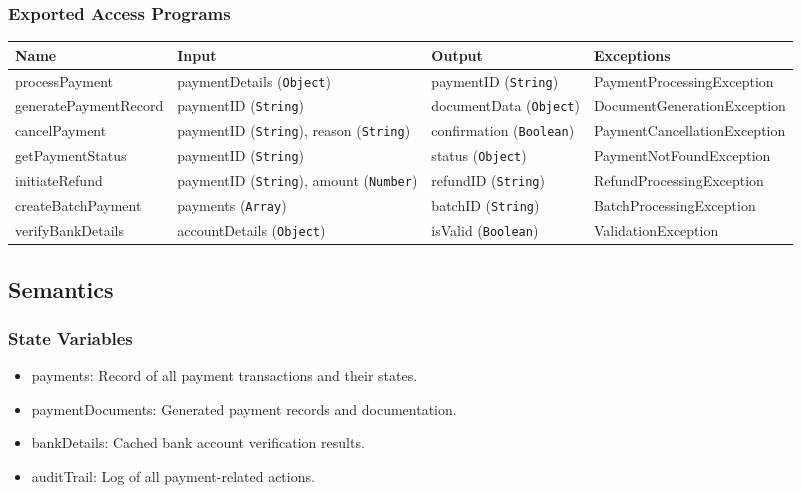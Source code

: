\documentclass[12pt, titlepage]{article}
\begin{document}
\subsubsection{Exported Access Programs}
\begin{center}
    \scriptsize
    \begin{tabular}{|p{3cm}|p{4cm}|p{4cm}|p{4cm}|} %
        \hline
        \textbf{Name} & \textbf{Input} & \textbf{Output} & \textbf{Exceptions} \\
        \hline
        processPayment & paymentDetails (\texttt{Object}) & paymentID (\texttt{String}) & PaymentProcessingException \\
        \hline
        generatePaymentRecord & paymentID (\texttt{String}) & documentData (\texttt{Object}) & DocumentGenerationException \\
        \hline
        cancelPayment & paymentID (\texttt{String}), reason (\texttt{String}) & confirmation (\texttt{Boolean}) & PaymentCancellationException \\
        \hline
        getPaymentStatus & paymentID (\texttt{String}) & status (\texttt{Object}) & PaymentNotFoundException \\
        \hline
        initiateRefund & paymentID (\texttt{String}), amount (\texttt{Number}) & refundID (\texttt{String}) & RefundProcessingException \\
        \hline
        createBatchPayment & payments (\texttt{Array}) & batchID (\texttt{String}) & BatchProcessingException \\
        \hline
        verifyBankDetails & accountDetails (\texttt{Object}) & isValid (\texttt{Boolean}) & ValidationException \\
        \hline
    \end{tabular}
\end{center}

\subsection{Semantics}
\subsubsection{State Variables}
\begin{itemize}
    \item payments: Record of all payment transactions and their states.
    \item paymentDocuments: Generated payment records and documentation.
    \item bankDetails: Cached bank account verification results.
    \item auditTrail: Log of all payment-related actions.
\end{itemize}
\end{document}

